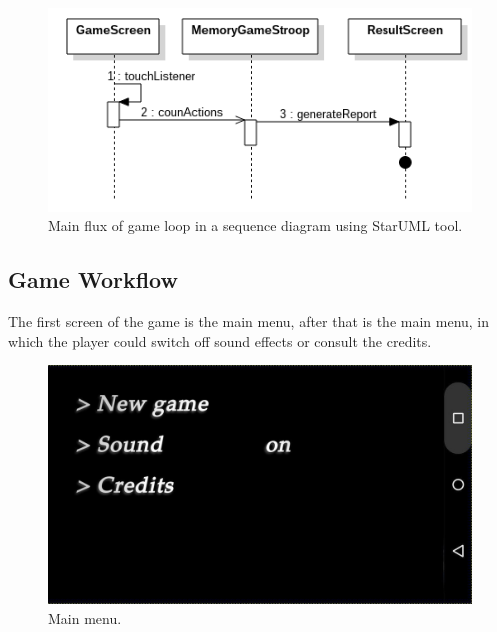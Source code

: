 						\begin{figure}[htp]
							\begin{center}
								\includegraphics[scale=0.65]{chapters/desenvolvimento/img/sequence.png}
								\caption{Main flux of game loop in a sequence diagram using StarUML tool.}
								\label{sequence}
							\end{center}
						\end{figure}

\subsection{Game Workflow}

The first screen of the game is the main menu, after that is the main menu, in which the player could switch off sound effects or consult the credits.

						\begin{figure}[htp]
							\begin{center}
								\includegraphics[scale=0.35]{chapters/desenvolvimento/img/menu.png}
								\caption{Main menu.}
								\label{menu}
							\end{center}
						\end{figure}
		
